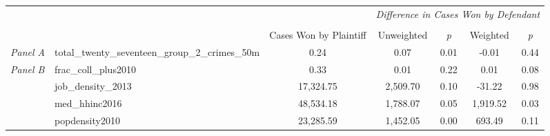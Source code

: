 \begin{tabular}{llccccc}
\toprule
 &  & \textit{} & \multicolumn{4}{c}{\textit{Difference in Cases Won by Defendant}} \\
\cline{4-7}
\\
 &  & Cases Won by Plaintiff & Unweighted & \emph{p} & Weighted & \emph{p} \\
\midrule
\textit{Panel A} & total_twenty_seventeen_group_2_crimes_50m & 0.24 & 0.07 & 0.01 & -0.01 & 0.44 \\
\cline{1-7}
\multirow[c]{4}{3cm}{\textit{Panel B}} & frac_coll_plus2010 & 0.33 & 0.01 & 0.22 & 0.01 & 0.08 \\
 & job_density_2013 & 17,324.75 & 2,509.70 & 0.10 & -31.22 & 0.98 \\
 & med_hhinc2016 & 48,534.18 & 1,788.07 & 0.05 & 1,919.52 & 0.03 \\
 & popdensity2010 & 23,285.59 & 1,452.05 & 0.00 & 693.49 & 0.11 \\
\cline{1-7}
\bottomrule
\end{tabular}
